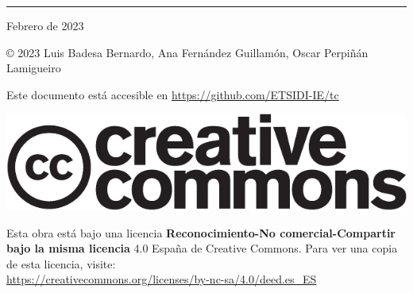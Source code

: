 
\chapterprecis{\vfill{}
}
\rule[.5ex]{\linewidth}{1pt} 

Febrero de 2023

© 2023 Luis Badesa Bernardo, Ana Fernández Guillamón, Oscar Perpiñán Lamigueiro

Este documento está accesible en \url{https://github.com/ETSIDI-IE/tc}

\begin{center}
\includegraphics[scale=0.5]{../figs/cc-logo}
\par\end{center}

Esta obra está bajo una licencia \textbf{Reconocimiento-No comercial-Compartir
bajo la misma licencia} 4.0 España de Creative Commons. Para ver una
copia de esta licencia, visite:\\
 \url{https://creativecommons.org/licenses/by-nc-sa/4.0/deed.es_ES}

